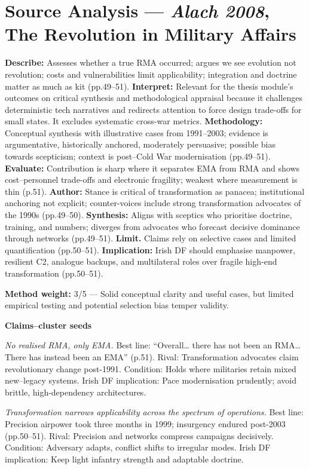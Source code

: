 \section*{Source Analysis — \textit{Alach 2008}, The Revolution in Military Affairs}
\textbf{Describe:} Assesses whether a true RMA occurred; argues we see evolution not revolution; costs and vulnerabilities limit applicability; integration and doctrine matter as much as kit (pp.49–51).
\textbf{Interpret:} Relevant for the thesis module’s outcomes on critical synthesis and methodological appraisal because it challenges deterministic tech narratives and redirects attention to force design trade-offs for small states. It excludes systematic cross-war metrics.
\textbf{Methodology:} Conceptual synthesis with illustrative cases from 1991–2003; evidence is argumentative, historically anchored, moderately persuasive; possible bias towards scepticism; context is post–Cold War modernisation (pp.49–51).
\textbf{Evaluate:} Contribution is sharp where it separates EMA from RMA and shows cost–personnel trade-offs and electronic fragility; weakest where measurement is thin (p.51).
\textbf{Author:} Stance is critical of transformation as panacea; institutional anchoring not explicit; counter-voices include strong transformation advocates of the 1990s (pp.49–50).
\textbf{Synthesis:} Aligns with sceptics who prioritise doctrine, training, and numbers; diverges from advocates who forecast decisive dominance through networks (pp.49–51).
\textbf{Limit.} Claims rely on selective cases and limited quantification (pp.50–51).
\textbf{Implication:} Irish DF should emphasise manpower, resilient C2, analogue backups, and multilateral roles over fragile high-end transformation (pp.50–51).

\textbf{Method weight:} 3/5 — Solid conceptual clarity and useful cases, but limited empirical testing and potential selection bias temper validity.

\textbf{Claims–cluster seeds}

\textit{No realised RMA, only EMA.} Best line: “Overall… there has not been an RMA… There has instead been an EMA” (p.51). Rival: Transformation advocates claim revolutionary change post-1991. Condition: Holds where militaries retain mixed new–legacy systems. Irish DF implication: Pace modernisation prudently; avoid brittle, high-dependency architectures.

\textit{Transformation narrows applicability across the spectrum of operations.} Best line: Precision airpower took three months in 1999; insurgency endured post-2003 (pp.50–51). Rival: Precision and networks compress campaigns decisively. Condition: Adversary adapts, conflict shifts to irregular modes. Irish DF implication: Keep light infantry strength and adaptable doctrine.

